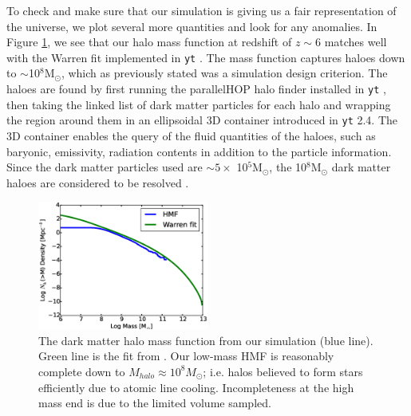 


To check and make sure that our simulation is giving us a fair representation of the universe, we plot several more quantities and look for any anomalies.  In Figure \ref{HMF}, we see that our halo mass function at redshift of $z \sim 6$ matches well with the Warren fit implemented in \texttt{yt} \citep{WarrenEtAl2006,TurkEtAl2011}.  The mass function captures haloes down to $\sim$10$^8$M$_\odot$, which as previously stated was a simulation design criterion.  The haloes are found by first running the parallelHOP halo finder installed in \texttt{yt} \citep{SkoryEtAl2010}, then taking the linked list of dark matter particles for each halo and wrapping the region around them in an ellipsoidal 3D container introduced in \texttt{yt} 2.4.  The 3D container enables the query of the fluid quantities of the haloes, such as baryonic, emissivity, radiation contents in addition to the particle information.  Since the dark matter particles used are $\sim 5 \times$ 10$^5$M$_\odot$, the 10$^8$M$_\odot$ dark matter haloes are considered to be resolved \citep{TrentiEtAl2010}.

\begin{figure}
	\includegraphics[width=0.5\textwidth]{HD14475_HMF.eps}
	\caption{The dark matter halo mass function from our simulation (blue line).  Green line is the fit from \citep{WarrenEtAl2006}. Our low-mass HMF is reasonably complete down to $M_{halo} \approx 10^8 M_{\odot}$; i.e. halos believed to form stars efficiently due to atomic line cooling. Incompleteness at the high mass end is due to the limited volume sampled.}
	\label{HMF}
\end{figure}

